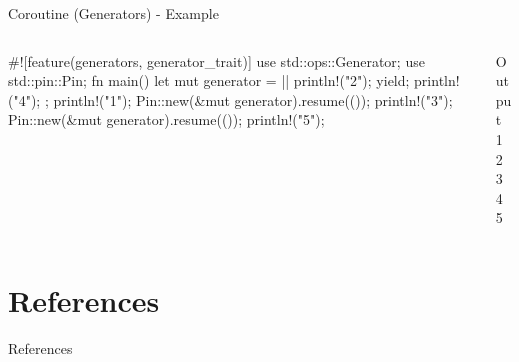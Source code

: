 \documentclass[10pt,xcolor={dvipsnames}, aspectratio=169]{beamer}
\begin{document}
    \begin{frame}[fragile]{Coroutine (Generators) - Example}
        \begin{columns}[T]
			\begin{column}{0.6 \textwidth}
                \begin{rustcode}
#![feature(generators, generator_trait)]
use std::ops::Generator;
use std::pin::Pin;
fn main() {
    let mut generator = || {
        println!("2");
        yield;
        println!("4");
    };
    println!("1");
    Pin::new(&mut generator).resume(());
    println!("3");
    Pin::new(&mut generator).resume(());
    println!("5");
}
                \end{rustcode}
			\end{column}
			\begin{column}{0.4 \textwidth}
				\begin{block}{Output}
					1\\
                    2\\
                    3\\
                    4\\
                    5
				\end{block}
			\end{column}
		\end{columns}
    \end{frame}

\begin{frame}
\end{frame}

\section{References}
	\begin{frame}[allowframebreaks]{References}
		\nocite{*}
		
		
	\end{frame}
\end{document}
